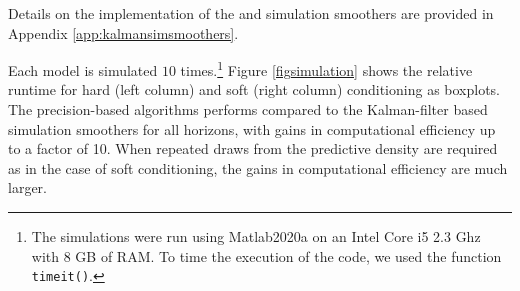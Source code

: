 \documentclass[notitlepage,a4paper,12pt]{article}
\begin{document}
\begin{ThreePartTable}
Details on the implementation of the \citet{carterkohn1994_biomtr} and \citet{durbinkoopman2002_biomtr} simulation smoothers are provided in Appendix \ref{app:kalmansimsmoothers}.

Each model is simulated $10$ times.\footnote{The simulations were run using Matlab2020a on an Intel Core i5 2.3 Ghz with 8 GB of RAM. To time the execution of the code, we used the function \texttt{timeit()}.} Figure \ref{figsimulation} shows the relative runtime for hard (left column) and soft (right column) conditioning as boxplots. The precision-based algorithms performs compared to the Kalman-filter based simulation smoothers for all horizons, with gains in computational efficiency up to a factor of 10. When repeated draws from the predictive density are required as in the case of soft conditioning, the gains in computational efficiency are much larger.


\end{ThreePartTable}
\end{document}
